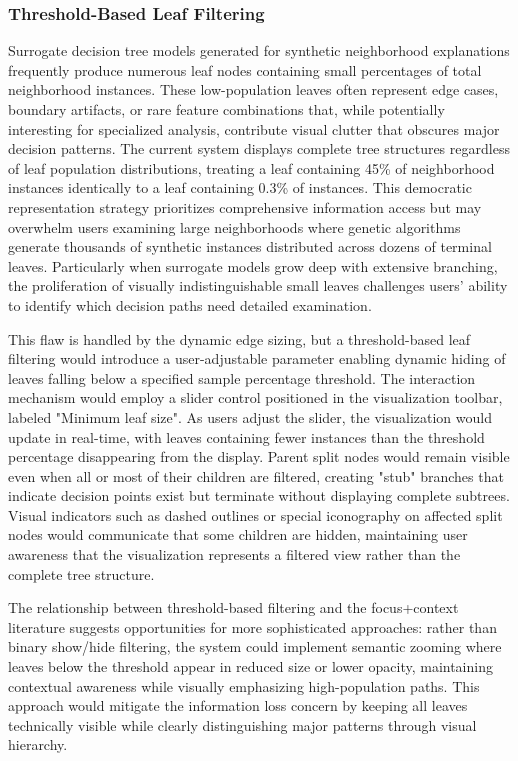 \subsubsection{Threshold-Based Leaf Filtering}

Surrogate decision tree models generated for synthetic neighborhood explanations frequently produce numerous leaf nodes containing small percentages of total neighborhood instances. These low-population leaves often represent edge cases, boundary artifacts, or rare feature combinations that, while potentially interesting for specialized analysis, contribute visual clutter that obscures major decision patterns. The current system displays complete tree structures regardless of leaf population distributions, treating a leaf containing 45\% of neighborhood instances identically to a leaf containing 0.3\% of instances. This democratic representation strategy prioritizes comprehensive information access but may overwhelm users examining large neighborhoods where genetic algorithms generate thousands of synthetic instances distributed across dozens of terminal leaves. Particularly when surrogate models grow deep with extensive branching, the proliferation of visually indistinguishable small leaves challenges users' ability to identify which decision paths need detailed examination.

This flaw is handled by the dynamic edge sizing, but a threshold-based leaf filtering would introduce a user-adjustable parameter enabling dynamic hiding of leaves falling below a specified sample percentage threshold. The interaction mechanism would employ a slider control positioned in the visualization toolbar, labeled "Minimum leaf size". As users adjust the slider, the visualization would update in real-time, with leaves containing fewer instances than the threshold percentage disappearing from the display. Parent split nodes would remain visible even when all or most of their children are filtered, creating "stub" branches that indicate decision points exist but terminate without displaying complete subtrees. Visual indicators such as dashed outlines or special iconography on affected split nodes would communicate that some children are hidden, maintaining user awareness that the visualization represents a filtered view rather than the complete tree structure.

The relationship between threshold-based filtering and the focus+context literature \cite{readingsInformationVi} suggests opportunities for more sophisticated approaches: rather than binary show/hide filtering, the system could implement semantic zooming where leaves below the threshold appear in reduced size or lower opacity, maintaining contextual awareness while visually emphasizing high-population paths. This approach would mitigate the information loss concern by keeping all leaves technically visible while clearly distinguishing major patterns through visual hierarchy.

